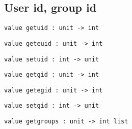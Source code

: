\subsection*{User id, group id }\begin{verbatim}
value getuid : unit -> int
\end{verbatim}
%
\begin{comment}
 Return the user id of the user executing the process. 
\end{comment}
\begin{verbatim}
value geteuid : unit -> int
\end{verbatim}
%
\begin{comment}
 Return the effective user id under which the process runs. 
\end{comment}
\begin{verbatim}
value setuid : int -> unit
\end{verbatim}
%
\begin{comment}
 Set the real user id and effective user id for the process. 
\end{comment}
\begin{verbatim}
value getgid : unit -> int
\end{verbatim}
%
\begin{comment}
 Return the group id of the user executing the process. 
\end{comment}
\begin{verbatim}
value getegid : unit -> int
\end{verbatim}
%
\begin{comment}
 Return the effective group id under which the process runs. 
\end{comment}
\begin{verbatim}
value setgid : int -> unit
\end{verbatim}
%
\begin{comment}
 Set the real group id and effective group id for the process. 
\end{comment}
\begin{verbatim}
value getgroups : unit -> int list
\end{verbatim}
%
\begin{comment}
 Return the list of groups to which the user executing the process
           belongs. 
\end{comment}
